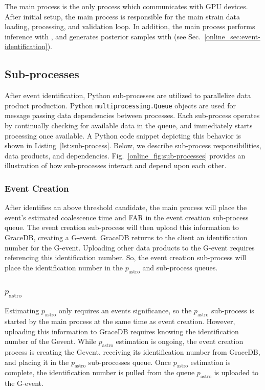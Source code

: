 \begin{refsection}
The main process is the only process which communicates with GPU devices. 
After initial setup, the main process is responsible for the main strain data loading, processing, and validation loop. 
In addition, the main process performs inference with \aframe, and generates posterior samples with \amplfi (see Sec.~\ref{online_sec:event-identification}). 

\subsection{Sub-processes} \label{online_sec:sub-process}
After event identification, Python sub-processes are utilized to parallelize data product production. 
Python \texttt{multiprocessing.Queue} objects are used for message passing data dependencies between processes. 
Each sub-process operates by continually checking for available data in the queue, and immediately starts processing once available. 
A Python code snippet depicting this behavior is shown in Listing~\ref{lst:sub-process}. 
Below, we describe sub-process responsibilities, data products, and dependencies. 
Fig.~\ref{online_fig:sub-processes} provides an illustration of how sub-processes interact and depend upon each other. 


 

\subsubsection{Event Creation}
After \aframe identifies an above threshold candidate, the main process will place the event's estimated coalescence time and FAR in the event creation sub-process queue. 
The event creation sub-process will then upload this information to GraceDB, creating a G-event. 
GraceDB returns to the client an identification number for the G-event. 
Uploading other data products to the G-event requires referencing this identification number. 
So, the event creation sub-process will place the identification number in the $p_{\mathrm{astro}}$ and \amplfi sub-process queues.

\subsubsection{$p_{\mathrm{astro}}$}
Estimating $p_{\mathrm{astro}}$ only requires an events significance, so the $p_{\mathrm{astro}}$ sub-process is started by the main process at the same time as event creation. 
However, uploading this information to GraceDB requires knowing the identification number of the Gevent. 
While $p_{\mathrm{astro}}$ estimation is ongoing, the event creation process is creating the Gevent, receiving its identification number from GraceDB, and placing it in the $p_{\mathrm{astro}}$ sub-processes queue. 
Once $p_{\mathrm{astro}}$ estimation is complete, the identification number is pulled from the queue $p_{\mathrm{astro}}$ is uploaded to the G-event. 


\end{refsection}
